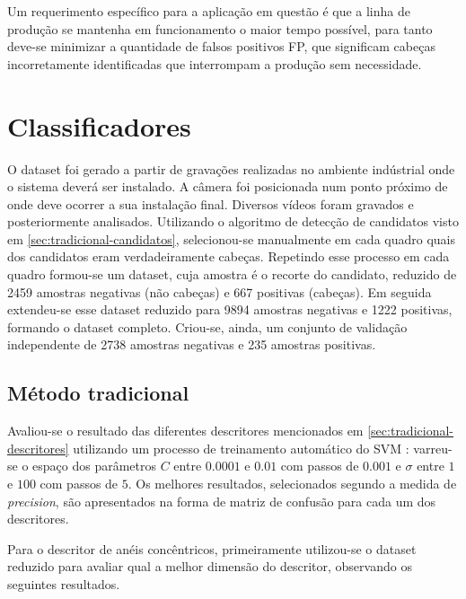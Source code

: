 Um requerimento específico para a aplicação em questão é que a linha de produção se mantenha em funcionamento o maior tempo possível, para tanto deve-se minimizar a quantidade de falsos positivos FP, que significam cabeças incorretamente identificadas que interrompam a produção sem necessidade.

\section{Classificadores}
\label{sec:resultados-classificadores}
O dataset foi gerado a partir de gravações realizadas no ambiente indústrial onde o sistema deverá ser instalado. A câmera foi posicionada num ponto próximo de onde deve ocorrer a sua instalação final. Diversos vídeos foram gravados e posteriormente analisados. Utilizando o algoritmo de detecção de candidatos visto em \ref{sec:tradicional-candidatos}, selecionou-se manualmente em cada quadro quais dos candidatos eram verdadeiramente cabeças. Repetindo esse processo em cada quadro formou-se um dataset, cuja amostra é o recorte do candidato, reduzido de 2459 amostras negativas (não cabeças) e 667 positivas (cabeças). Em seguida extendeu-se esse dataset reduzido para 9894 amostras negativas e 1222 positivas, formando o dataset completo. Criou-se, ainda, um conjunto de validação independente de 2738 amostras negativas e 235 amostras positivas.

\subsection{Método tradicional}
Avaliou-se o resultado das diferentes descritores mencionados em \ref{sec:tradicional-descritores} utilizando um processo de treinamento automático do SVM \cite{scikit-learn}: varreu-se o espaço dos parâmetros $C$ entre $0.0001$ e $0.01$ com passos de $0.001$ e $\sigma$ entre $1$ e $100$ com passos de $5$. Os melhores resultados, selecionados segundo a medida de \textit{precision}, são apresentados na forma de matriz de confusão para cada um dos descritores.

\begin{table}[h]
\end{table}

Para o descritor de anéis concêntricos, primeiramente utilizou-se o dataset reduzido para avaliar qual a melhor dimensão do descritor, observando os seguintes resultados.


